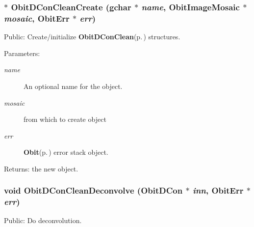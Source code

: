\subsubsection{$\ast$ Obit\-DCon\-Clean\-Create (gchar $\ast$ {\em name}, {\bf Obit\-Image\-Mosaic} $\ast$ {\em mosaic}, {\bf Obit\-Err} $\ast$ {\em err})}\label{ObitDConClean_8h_a14}


Public: Create/initialize {\bf Obit\-DCon\-Clean}{\rm (p.\,\pageref{structObitDConClean})} structures. 

\begin{Desc}
\item[Parameters:]
\begin{description}
\item[{\em name}]An optional name for the object. \item[{\em mosaic}]from which to create object \item[{\em err}]{\bf Obit}{\rm (p.\,\pageref{structObit})} error stack object. \end{description}
\end{Desc}
\begin{Desc}
\item[Returns:]the new object. \end{Desc}
\subsubsection{\setlength{\rightskip}{0pt plus 5cm}void Obit\-DCon\-Clean\-Deconvolve ({\bf Obit\-DCon} $\ast$ {\em inn}, {\bf Obit\-Err} $\ast$ {\em err})}\label{ObitDConClean_8h_a18}


Public: Do deconvolution. 

